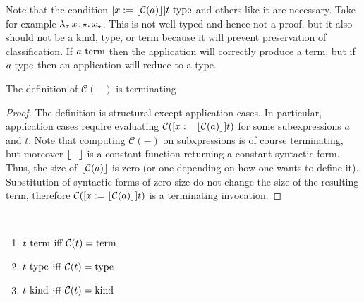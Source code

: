 


Note that the condition $[x := \lfloor \mathcal{C}(a) \rfloor]t~\textnormal{type}$ and others like it are necessary.
Take for example ${\lambda_\tau}\, x\! : \! \star.\, x_\star$.
This is not well-typed and hence not a proof, but it also should not be a kind, type, or term because it will prevent preservation of classification.
If $a~\textnormal{term}$ then the application will correctly produce a term, but if $a~\textnormal{type}$ then an application will reduce to a type.

\begin{lemma}
    The definition of $\mathcal{C}(-)$ is terminating
\end{lemma}
\begin{proof}
    The definition is structural except application cases.
    In particular, application cases require evaluating $\mathcal{C}([x := \lfloor \mathcal{C}(a) \rfloor]t)$ for some subexpressions $a$ and $t$.
    Note that computing $\mathcal{C}(-)$ on subxpressions is of course terminating, but moreover $\lfloor - \rfloor$ is a constant function returning a constant syntactic form.
    Thus, the size of $\lfloor \mathcal{C}(a) \rfloor$ is zero (or one depending on how one wants to define it).
    Substitution of syntactic forms of zero size do not change the size of the resulting term, therefore $\mathcal{C}([x := \lfloor \mathcal{C}(a) \rfloor]t)$ is a terminating invocation.
\end{proof}

\begin{definition}
    \textcolor{white}{\_}
    \begin{enumerate}
        \item $t~\textnormal{term}$ iff $\mathcal{C}(t) =\!\!~\textnormal{term}$
        \item $t~\textnormal{type}$ iff $\mathcal{C}(t) =\!\!~\textnormal{type}$
        \item $t~\textnormal{kind}$ iff $\mathcal{C}(t) =\!\!~\textnormal{kind}$
    \end{enumerate}
\end{definition}

